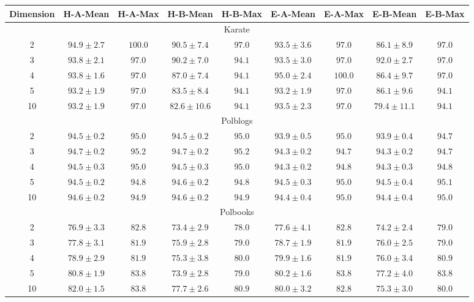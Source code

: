 \documentclass{article}
\begin{document}
\begin{table} 
    \centering 
    \begin{tabular}{|c|cccc|cccc|}
        \hline Dimension & H-A-Mean & H-A-Max & H-B-Mean & H-B-Max & E-A-Mean & E-A-Max & E-B-Mean & E-B-Max\\ \hline
        
        \hline
        \multicolumn{9}{|c|}{Karate} \\ 
        \hline
        2&$94.9 \pm 2.7$&$100.0$&$90.5 \pm 7.4$&$97.0$&$93.5 \pm 3.6$&$97.0$&$86.1 \pm8.9$&$97.0$\\ \hline
        3&$93.8 \pm 2.1$&$97.0$&$90.2 \pm 7.0$&$94.1$&$93.5 \pm 3.0$&$97.0$&$92.0 \pm2.7$&$97.0$\\ \hline
        4&$93.8 \pm 1.6$&$97.0$&$87.0 \pm 7.4$&$94.1$&$95.0 \pm 2.4$&$100.0$&$86.4 \pm9.7$&$97.0$\\ \hline
        5&$93.2 \pm 1.9$&$97.0$&$83.5 \pm 8.4$&$94.1$&$93.2 \pm 1.9$&$97.0$&$86.1 \pm9.6$&$94.1$\\ \hline
        10&$93.2 \pm 1.9$&$97.0$&$82.6 \pm 10.6$&$94.1$&$93.5 \pm 2.3$&$97.0$&$79.4 \pm11.1$&$94.1$\\ \hline
        
        \hline
        \multicolumn{9}{|c|}{Polblogs} \\ 
        \hline
		2&$94.5 \pm 0.2$&$95.0$&$94.5 \pm 0.2$&$95.0$&$93.9 \pm 0.5$&$95.0$&$93.9 \pm0.4$&$94.7$\\ \hline
		3&$94.7 \pm 0.2$&$95.2$&$94.7 \pm 0.2$&$95.2$&$94.3 \pm 0.2$&$94.7$&$94.3 \pm0.2$&$94.7$\\ \hline
		4&$94.5 \pm 0.3$&$95.0$&$94.5 \pm 0.3$&$95.0$&$94.3 \pm 0.2$&$94.8$&$94.3 \pm0.3$&$94.8$\\ \hline
		5&$94.5 \pm 0.2$&$94.8$&$94.6 \pm 0.2$&$94.8$&$94.5 \pm 0.3$&$95.0$&$94.5 \pm0.4$&$95.1$\\ \hline
		10&$94.6 \pm 0.2$&$94.9$&$94.6 \pm 0.2$&$94.9$&$94.4 \pm 0.4$&$95.0$&$94.4 \pm0.4$&$95.0$\\ \hline

        \hline
        \multicolumn{9}{|c|}{Polbooks} \\ 
        \hline
		2&$76.9 \pm 3.3$&$82.8$&$73.4 \pm 2.9$&$78.0$&$77.6 \pm 4.1$&$82.8$&$74.2 \pm2.4$&$79.0$\\ \hline
		3&$77.8 \pm 3.1$&$81.9$&$75.9 \pm 2.8$&$79.0$&$78.7 \pm 1.9$&$81.9$&$76.0 \pm2.5$&$79.0$\\ \hline
		4&$78.9 \pm 2.9$&$81.9$&$75.3 \pm 3.8$&$80.0$&$79.9 \pm 1.6$&$81.9$&$76.0 \pm3.4$&$80.9$\\ \hline
		5&$80.8 \pm 1.9$&$83.8$&$73.9 \pm 2.8$&$79.0$&$80.2 \pm 1.6$&$83.8$&$77.2 \pm4.0$&$83.8$\\ \hline
		10&$82.0 \pm 1.5$&$83.8$&$77.7 \pm 2.6$&$80.9$&$80.0 \pm 3.2$&$82.8$&$75.3 \pm3.0$&$80.0$\\ \hline


\end{tabular}
\end{table}
\end{document}
